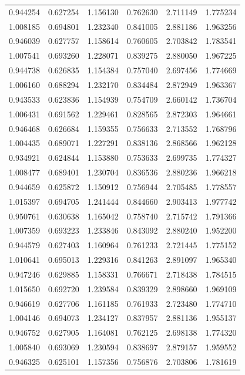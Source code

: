 \begin{table}[htbp]
\begin{center}
\begin{tabular}{ |c|c|c|c|c|c| }
        0.944254 & 0.627254 & 1.156130 & 0.762630 & 2.711149 & 1.775234 \\
        1.008185 & 0.694801 & 1.232340 & 0.841005 & 2.881186 & 1.963256 \\
        0.946039 & 0.627757 & 1.158614 & 0.760605 & 2.703842 & 1.783541 \\
        1.007541 & 0.693260 & 1.228071 & 0.839275 & 2.880050 & 1.967225 \\
        0.944738 & 0.626835 & 1.154384 & 0.757040 & 2.697456 & 1.774669 \\
        1.006160 & 0.688294 & 1.232170 & 0.834484 & 2.872949 & 1.963367 \\
        0.943533 & 0.623836 & 1.154939 & 0.754709 & 2.660142 & 1.736704 \\
        1.006431 & 0.691562 & 1.229461 & 0.828565 & 2.872303 & 1.964661 \\
        0.946468 & 0.626684 & 1.159355 & 0.756633 & 2.713552 & 1.768796 \\
        1.004435 & 0.689071 & 1.227291 & 0.838136 & 2.868566 & 1.962128 \\
        0.934921 & 0.624844 & 1.153880 & 0.753633 & 2.699735 & 1.774327 \\
        1.008477 & 0.689401 & 1.230704 & 0.836536 & 2.880236 & 1.966218 \\
        0.944659 & 0.625872 & 1.150912 & 0.756944 & 2.705485 & 1.778557 \\
        1.015397 & 0.694705 & 1.241444 & 0.844660 & 2.903413 & 1.977742 \\
        0.950761 & 0.630638 & 1.165042 & 0.758740 & 2.715742 & 1.791366 \\
        1.007359 & 0.693223 & 1.233846 & 0.843092 & 2.880240 & 1.952200 \\
        0.944579 & 0.627403 & 1.160964 & 0.761233 & 2.721445 & 1.775152 \\
        1.010641 & 0.695013 & 1.229316 & 0.841263 & 2.891097 & 1.965340 \\
        0.947246 & 0.629885 & 1.158331 & 0.766671 & 2.718438 & 1.784515 \\
        1.015650 & 0.692720 & 1.239584 & 0.839329 & 2.898660 & 1.969109 \\
        0.946619 & 0.627706 & 1.161185 & 0.761933 & 2.723480 & 1.774710 \\
        1.004146 & 0.694073 & 1.234127 & 0.837957 & 2.881136 & 1.955137 \\
        0.946752 & 0.627905 & 1.164081 & 0.762125 & 2.698138 & 1.774320 \\
        1.005840 & 0.693069 & 1.230594 & 0.838697 & 2.879157 & 1.959552 \\
        0.946325 & 0.625101 & 1.157356 & 0.756876 & 2.703806 & 1.781619 \\
     \hline
    \end{tabular}
    \end{center}
    \label{amd-ryzen-perf-2}
\end{table}

